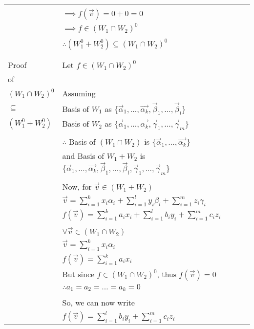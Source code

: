 \documentclass[journal,12pt]{IEEEtran}
\begin{document}
\begin{longtable}{|l|l|}
        & \\
        & $\implies f(\vec{v}) = 0 + 0 = 0$\\
        & $\implies f \in (W_1 \cap W_2)^0$\\
        & \\
        & $\therefore (W_1^0 + W_2^0) \subseteq (W_1 \cap W_2)^0$\\
        & \\
    \hline
        & \\
        Proof & Let $f \in (W_1 \cap W_2)^0$\\
        of & \\
        $(W_1 \cap W_2)^0$ & Assuming\\
        $\subseteq$ & Basis of $W_1$ as $\{ \vec{\alpha}_1,\ldots,\vec{\alpha_k}, \vec{\beta}_1,\ldots,\vec{\beta}_l \}$\\
        $(W_1^0 + W_2^0)$ & Basis of $W_2$ as $\{ \vec{\alpha}_1,\ldots,\vec{\alpha_k}, \vec{\gamma}_1,\ldots,\vec{\gamma}_m \}$\\
        & \\
        & $\therefore$ Basis of $(W_1 \cap W_2)$ is $\{ \vec{\alpha}_1,\ldots,\vec{\alpha_k} \}$\\
        & and Basis of $W_1 + W_2$ is $\{ \vec{\alpha}_1,\ldots,\vec{\alpha_k}, \vec{\beta}_1,\ldots,\vec{\beta}_l, \vec{\gamma}_1,\ldots,\vec{\gamma}_m\}$\\
        & \\
        & Now, for $\vec{v} \in (W_1 + W_2)$\\
        & $\vec{v} = \sum_{i=1}^{k} x_i\alpha_i + \sum_{i=1}^{l} y_i\beta_i + \sum_{i=1}^{m} z_i\gamma_i$\\
        & $f(\vec{v}) = \sum_{i=1}^{k} a_ix_i + \sum_{i=1}^{l} b_iy_i + \sum_{i=1}^{m} c_iz_i$\\
        & \\
        & $\forall \vec{v} \in (W_1 \cap W_2)$\\
        & $\vec{v} = \sum_{i=1}^{k} x_i\alpha_i$\\
    \hline
        & $f(\vec{v}) = \sum_{i=1}^{k} a_ix_i$\\
        & But since $f \in (W_1 \cap W_2)^0$, thus $f(\vec{v}) = 0$\\
        & $\therefore a_1 = a_2 = \ldots = a_k = 0$\\
        & \\
        & So, we can now write\\
        & $f(\vec{v}) = \sum_{i=1}^{l} b_iy_i + \sum_{i=1}^{m} c_iz_i$\\

\end{longtable}
\end{document}
